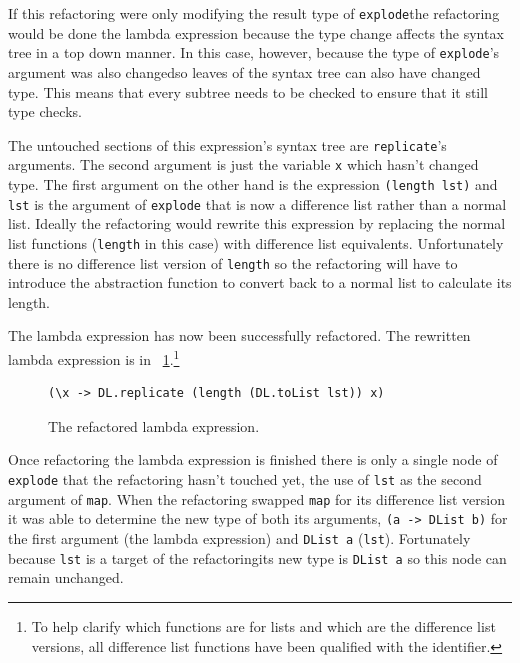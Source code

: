 If this refactoring were only modifying the result type of \texttt{explode}\DIFaddbegin \DIFadd{, }\DIFaddend the refactoring would be done \DIFdelbegin {}\DIFdelend \DIFaddbegin {}\DIFaddend the lambda expression because the type change affects the syntax tree in a top down manner. In this case, however, because  the type of \texttt{explode}'s argument was also changed\DIFaddbegin \DIFadd{, }\DIFaddend so leaves of the syntax tree can also have changed type. This means that every subtree needs to be checked to ensure that it still type checks.

The untouched sections of this expression's syntax tree are \texttt{replicate}'s arguments. The second argument is just the variable \texttt{x} which hasn't changed type. The first argument on the other hand is the expression \texttt{(length lst)} and \texttt{lst} is the argument of \texttt{explode} that is now a difference list rather than a normal list. Ideally the refactoring would rewrite this expression by replacing the normal list functions (\texttt{length} in this case) with difference list equivalents. Unfortunately there is no difference list version of \texttt{length} so the refactoring will have to introduce the abstraction function to convert back to a normal list to calculate its length. 

The lambda expression has now been successfully refactored. The rewritten lambda expression is in \DIFdelbegin {}\DIFdelend \DIFaddbegin {}\DIFaddend ~\ref{lamRef}.\footnote{To help clarify which functions are for lists and which are the difference list versions, all difference list functions have been qualified with the \DIFdelbegin \texttt{} %
\DIFdelend \DIFaddbegin \texttt{} \DIFaddend identifier.}

\begin{figure}[t]
\DIFdelbeginFL %
\DIFdelendFL \DIFaddbeginFL \begin{lstlisting}
(\x -> DL.replicate (length (DL.toList lst)) x)
\end{lstlisting}
\DIFaddendFL \caption{The refactored lambda expression.}
\label{lamRef}
\end{figure}


Once refactoring the lambda expression is finished there is only a single node of \texttt{explode} that the refactoring hasn't touched yet, the use of \texttt{lst} as the second argument of \texttt{map}. When the refactoring swapped \texttt{map} for its difference list version it was able to determine the new type of both its arguments, \texttt{(a -> DList b)} for the first argument (the lambda expression) and \texttt{DList a} (\texttt{lst}). Fortunately because \texttt{lst} is a target of the refactoring\DIFaddbegin \DIFadd{, }\DIFaddend its new type is \texttt{DList a} so this node can remain unchanged.

